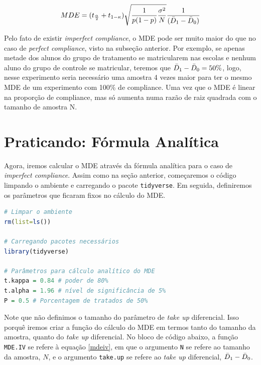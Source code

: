 \begin{equation}\label{mdeiv}
    MDE = (t_{\frac{\alpha}{2}} + t_{1-\kappa})\sqrt{\frac{1}{p(1-p)}\frac{\sigma^2}{N}}\frac{1}{(\Bar{D}_1 - \Bar{D}_0)}
\end{equation}
  

Pelo fato de existir \textit{imperfect compliance}, o MDE pode ser muito maior do que no caso de \textit{perfect compliance}, visto na subseção anterior. Por exemplo, se apenas metade dos alunos do grupo de tratamento se matricularem nas escolas e nenhum aluno do grupo de controle se matricular, teremos que $\Bar{D}_1 - \Bar{D}_0 = 50\%$, logo, nesse experimento seria necessário uma amostra 4 vezes maior para ter o mesmo MDE de um experimento com 100\% de compliance. Uma vez que o MDE é linear na proporção de compliance, mas só aumenta numa razão de raiz quadrada com o tamanho de amostra N.

\section{Praticando: Fórmula Analítica}

Agora, iremos calcular o MDE através da fórmula analítica para o caso de \textit{imperfect compliance}. Assim como na seção anterior, começaremos o código limpando o ambiente e carregando o pacote \texttt{tidyverse}. Em seguida, definiremos os parâmetros que ficaram fixos no cálculo do MDE.

\begin{boxH}
\begin{lstlisting}[language = R]
# Limpar o ambiente 
rm(list=ls())

# Carregando pacotes necessários
library(tidyverse)

# Parâmetros para cálculo analítico do MDE
t.kappa = 0.84 # poder de 80%
t.alpha = 1.96 # nível de significância de 5%
P = 0.5 # Porcentagem de tratados de 50%
\end{lstlisting}
\end{boxH}

Note que não definimos o tamanho do parâmetro de \textit{take up} diferencial. Isso porquê iremos criar a função do cálculo do MDE em termos tanto do tamanho da amostra, quanto do \textit{take up} diferencial. No bloco de código abaixo, a função \texttt{MDE.IV} se refere à equação \eqref{mdeiv}, em que o argumento \texttt{N} se refere ao tamanho da amostra, $N$, e o argumento \texttt{take.up} se refere ao \textit{take up} diferencial, $\Bar{D}_1 - \Bar{D}_0$.

